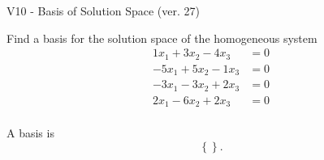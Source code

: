 \begin{exercise}
  \begin{exerciseTitle}V10 - Basis of Solution Space (ver. 27)\end{exerciseTitle}
  \begin{exerciseStatement}
    Find a basis for the solution space of the homogeneous system 
\begin{align*}
 1 x_ 1 + 3 x_ 2 -4 x_ 3 &= 0  \\ 
  -5 x_ 1 + 5 x_ 2 -1 x_ 3 &= 0  \\ 
  -3 x_ 1 -3 x_ 2 + 2 x_ 3 &= 0  \\ 
  2 x_ 1 -6 x_ 2 + 2 x_ 3 &= 0  \\ 
 \end{align*}


 
  \end{exerciseStatement}

  \begin{exerciseAnswer}
   A basis is   
\[\left\{\right\}.\]

  


  \end{exerciseAnswer}
\end{exercise}
